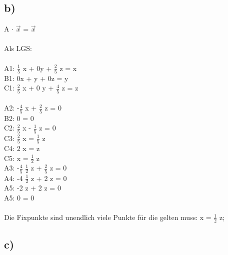 \documentclass{article}
\begin{document}
	 \subsection*{b)}
	 A $\cdot$ $\vec{x}$ = $\vec{x}$ \\ \\
	 Als LGS: \\ \\
	 A1: $\frac{1}{5}$ x + 0y + $\frac{2}{5}$ z = x \\
	 B1: 0x + y + 0z = y \\
	 C1: $\frac{2}{5}$ x + 0 y + $\frac{4}{5}$ z = z \\ \\
	 A2: -$\frac{4}{5}$ x + $\frac{2}{5}$ z = 0\\
	 B2: 0 = 0 \\
	 C2: $\frac{2}{5}$ x - $\frac{1}{5}$ z = 0\\
	 C3: $\frac{2}{5}$ x = $\frac{1}{5}$ z\\
	 C4: 2 x = z\\
	 C5: x = $\frac{1}{2}$ z \\
	 A3: -$\frac{4}{5}$ $\frac{1}{2}$ z + $\frac{2}{5}$ z = 0\\
	 A4: -4 $\frac{1}{2}$ z + 2 z = 0\\
	 A5: -2 z + 2 z = 0\\
	 A5: 0 = 0\\ \\
	 Die Fixpunkte sind unendlich viele Punkte für die gelten muss: x = $\frac{1}{2}$ z;
	 
	 \subsection*{c)}
	 
	   
\end{document}
